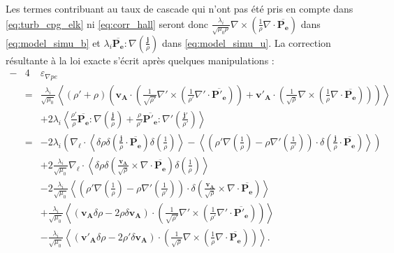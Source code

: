 Les termes contribuant au taux de cascade qui n'ont pas été pris en compte dans \eqref{eq:turb_cpg_elk} ni \eqref{eq:corr_hall} seront donc $\frac{\lambda_i}{ \sqrt{\mu_0\rho} }  \nabla \times \left(\frac{1}{\rho} \nabla \cdot \overline{\boldsymbol{P_{e}}}\right)$ dans \eqref{eq:model_simu_b} et $  \lambda_i \overline{\boldsymbol{P_{e}}} : \nabla \left(\frac{\boldsymbol{j}}{\rho} \right)$ dans \eqref{eq:model_simu_u}. La correction résultante à la loi exacte s'écrit après quelques manipulations : 
\begin{equation}
\label{eq:corr_pe} \boxed{
\begin{array}{lcl}
   -&4& \varepsilon_{\nabla pe}  \\%
   &=& \frac{\lambda_i}{\sqrt{\mu_0}} \left<\left(\rho' + \rho\right)\left(\boldsymbol{v_A} \cdot \left( \frac{1}{ \sqrt{\rho'} }  \nabla' \times \left(\frac{1}{\rho'} \nabla' \cdot \overline{\boldsymbol{P'_{e}}}\right)\right) + \boldsymbol{v'_A} \cdot \left( \frac{1}{ \sqrt{\rho} }  \nabla \times \left(\frac{1}{\rho} \nabla \cdot \overline{\boldsymbol{P_{e}}}\right)\right)\right) \right> \\%
   &&+ 2 \lambda_i\left< \frac{\rho'}{\rho}   \overline{\boldsymbol{P_{e}}} : \nabla \left(\frac{\boldsymbol{j}}{\rho} \right)   + \frac{\rho}{\rho'}  \overline{\boldsymbol{P'_{e}}} : \nabla' \left(\frac{\boldsymbol{j'}}{\rho'} \right) \right> \\%
   &=&   - 2 \lambda_i \left(\nabla_{\boldsymbol{\ell}} \cdot \left<\delta \rho \delta \left( \frac{ \boldsymbol{j}}{\rho} \cdot \overline{\boldsymbol{P_{e}}}\right) \delta \left(\frac{1}{\rho} \right) \right> - \left< \left(\rho'\nabla   \left(\frac{1}{\rho} \right) - \rho   \nabla'   \left(\frac{1}{\rho'} \right)\right) \cdot\delta \left(\frac{ \boldsymbol{j}}{\rho} \cdot \overline{\boldsymbol{P_{e}}}\right)\right>\right)  \\%
    &&+ 2 \frac{\lambda_i}{\sqrt{\mu_0}} \nabla_{\boldsymbol{\ell}} \cdot \left<\delta \rho \delta \left( \frac{\boldsymbol{v_A} }{\sqrt{\rho}} \times \nabla \cdot \overline{\boldsymbol{P_{e}}}\right) \delta \left(\frac{1}{\rho} \right) \right> \\
    &&-  2 \frac{\lambda_i}{\sqrt{\mu_0}}\left<  \left(\rho' \nabla   \left(\frac{1}{\rho} \right) - \rho \nabla'  \left(\frac{1}{\rho'} \right)\right)\cdot\delta \left(\frac{\boldsymbol{v_A}}{\sqrt{\rho}}  \times \nabla \cdot \overline{\boldsymbol{P_{e}}}\right)\right>\\%
   &&+\frac{\lambda_i}{\sqrt{\mu_0}} \left<\left(\boldsymbol{v_A} \delta  \rho  - 2 \rho \delta \boldsymbol{v_A}\right) \cdot \left( \frac{1}{ \sqrt{\rho'} }  \nabla' \times \left(\frac{1}{\rho'} \nabla' \cdot \overline{\boldsymbol{P'_{e}}}\right)\right) \right>\\ 
   &&-\frac{\lambda_i}{\sqrt{\mu_0}} \left<\left(\boldsymbol{v'_A} \delta  \rho  - 2 \rho' \delta \boldsymbol{v_A}\right) \cdot \left( \frac{1}{ \sqrt{\rho} }  \nabla \times \left(\frac{1}{\rho} \nabla \cdot \overline{\boldsymbol{P_{e}}}\right)\right) \right>.\\ %
   \end{array}}
\end{equation} 
